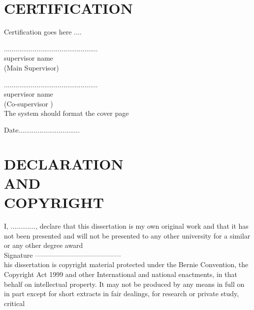 \documentclass[12pt]{report}    %
\begin{document}


\chapter*{\centering \MakeUppercase{Certification}}
Certification  goes here ....

\begin{center}
    

    .................................................\\
    
    
    supervisor name \\
    

    (Main Supervisor) 
    
    
    .................................................\\
    
    
    supervisor name \\
    
    
    (Co-supervisor ) \\The system should format the cover page
    
    Date................................
\end{center}



\chapter*{\centering \MakeUppercase{Declaration \\ And \\ Copyright}}

I, ............., declare that this dissertation is my own original work and that it
has not been presented and will not be presented to any other university for a similar
or any other degree award
    \vspace{2cm} \\
        Signature --------------------------------------
    \vspace{3cm} \\
his dissertation is copyright material protected under the Bernie Convention, the
Copyright Act 1999 and other International and national enactments, in that behalf
on intellectual property. It may not be produced by any means in full on in part
except for short extracts in fair dealings, for research or private study, critical
\end{document}
